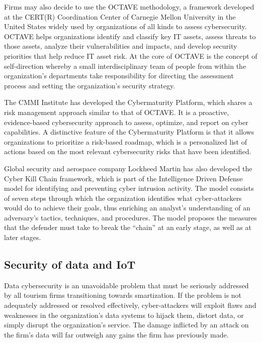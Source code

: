 \documentclass[
  letterpaper,
  DIV=11,
  numbers=noendperiod]{scrreprt}
\begin{document}
Firms may also decide to use the OCTAVE methodology, a framework
developed at the CERT(R) Coordination Center of Carnegie Mellon
University in the United States widely used by organizations of all
kinds to assess cybersecurity. OCTAVE helps organizations identify and
classify key IT assets, assess threats to those assets, analyze their
vulnerabilities and impacts, and develop security priorities that help
reduce IT asset risk. At the core of OCTAVE is the concept of
self-direction whereby a small interdisciplinary team of people from
within the organization's departments take responsibility for directing
the assessment process and setting the organization's security strategy.

The CMMI Institute has developed the Cybermaturity Platform, which
shares a risk management approach similar to that of OCTAVE. It is a
proactive, evidence-based cybersecurity approach to assess, optimize,
and report on cyber capabilities. A distinctive feature of the
Cybermaturity Platform is that it allows organizations to prioritize a
risk-based roadmap, which is a personalized list of actions based on the
most relevant cybersecurity risks that have been identified.

Global security and aerospace company Lockheed Martin has also developed
the Cyber Kill Chain framework, which is part of the Intelligence Driven
Defense model for identifying and preventing cyber intrusion activity.
The model consists of seven steps through which the organization
identifies what cyber-attackers would do to achieve their goals, thus
enriching an analyst's understanding of an adversary's tactics,
techniques, and procedures. The model proposes the measures that the
defender must take to break the ``chain'' at an early stage, as well as
at later stages.

\hypertarget{security-of-data-and-iot}{%
\subsection{Security of data and IoT}\label{security-of-data-and-iot}}

Data cybersecurity is an unavoidable problem that must be seriously
addressed by all tourism firms transitioning towards smartization. If
the problem is not adequately addressed or resolved effectively,
cyber-attackers will exploit flaws and weaknesses in the organization's
data systems to hijack them, distort data, or simply disrupt the
organization's service. The damage inflicted by an attack on the firm's
data will far outweigh any gains the firm has previously made.
\end{document}
